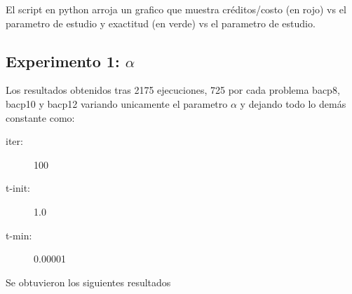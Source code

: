 \documentclass[letterpaper,10pt]{article}
\begin{document}

El script en python arroja un grafico que muestra créditos/costo (en rojo) vs el parametro de estudio y exactitud (en verde) vs el parametro de estudio.

\subsection{Experimento 1: $\alpha$}

Los resultados obtenidos tras 2175 ejecuciones, 725 por cada problema bacp8, bacp10 y bacp12 variando unicamente el parametro $\alpha$ y dejando todo lo demás constante como:
\begin{description}
    \item[iter:] 100
    \item[t-init:] 1.0
    \item[t-min:] 0.00001
\end{description}
Se obtuvieron los siguientes resultados
\end{document}
